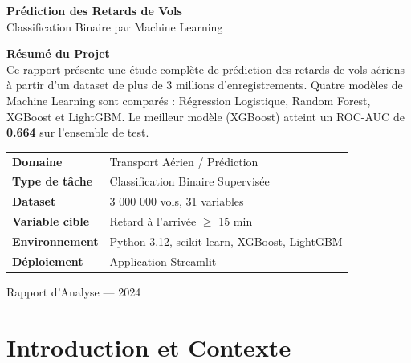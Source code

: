 \documentclass[12pt,a4paper]{article}
\begin{document}
\begin{titlepage}
  \centering
  \vspace*{1.5cm}

  {\Huge\bfseries\color{primary} Prédiction des Retards de Vols}\\[0.5cm]
  {\Large\color{darkgray} Classification Binaire par Machine Learning}\\[2cm]

  \begin{tcolorbox}[enhanced, colback=primary!10, colframe=primary, width=0.8\textwidth]
    \centering
    \textbf{Résumé du Projet}\\[0.3cm]
    \small
    Ce rapport présente une étude complète de prédiction des retards de vols aériens
    à partir d'un dataset de plus de 3 millions d'enregistrements. Quatre modèles de 
    Machine Learning sont comparés : Régression Logistique, Random Forest, XGBoost 
    et LightGBM. Le meilleur modèle (XGBoost) atteint un ROC-AUC de \textbf{0.664} 
    sur l'ensemble de test.
  \end{tcolorbox}

  \vspace{2cm}

  \begin{tabular}{ll}
    \toprule
    \textbf{Domaine} & Transport Aérien / Prédiction \\
    \textbf{Type de tâche} & Classification Binaire Supervisée \\
    \textbf{Dataset} & 3 000 000 vols, 31 variables \\
    \textbf{Variable cible} & Retard à l'arrivée $\geq$ 15 min \\
    \textbf{Environnement} & Python 3.12, scikit-learn, XGBoost, LightGBM \\
    \textbf{Déploiement} & Application Streamlit \\
    \bottomrule
  \end{tabular}

  \vfill
  {\large\color{darkgray} Rapport d'Analyse --- 2024}
\end{titlepage}

\tableofcontents
\newpage

\section{Introduction et Contexte}
\end{document}
